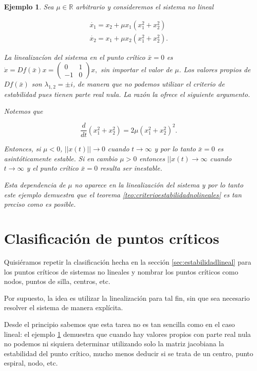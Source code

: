\documentclass[11pt]{book}
\theoremstyle{definition}
\numberwithin{definition}{section}
\theoremstyle{theorem}
\numberwithin{theorem}{section}
\numberwithin{lemma}{section}
\numberwithin{corollary}{section}
\theoremstyle{plain}
\newtheorem{example}{Ejemplo}
\numberwithin{example}{section}
\newcommand{\R}{{\ensuremath{\mathbb{R}}}}
\begin{document}
\begin{example} \label{ex:nolinealnohiperbolico}
Sea $\mu \in \R$ arbitrario y consideremos el sistema no lineal

$$
	\begin{array}{l}
		\dot{x_1} = x_2 + \mu x_1(x_1^2 + x_2^2) \\
		\dot{x_2} = x_1 + \mu x_2(x_1^2 + x_2^2).
	\end{array}
$$

La linealizacíon del sistema en el punto crítico $\bar{x} = 0$ es $\dot{x} = Df(\bar{x})x = \left( \begin{array}{ll} 0 & 1 \\ -1 & 0 \end{array} \right) x,$ sin importar el valor de $\mu$.
Los valores propios de $Df(\bar{x})$ son $\lambda_{1,2} = \pm i$, de manera que no podemos utilizar el criterio de estabilidad pues tienen parte real nula. La razón la ofrece el siguiente argumento.

Notemos que

$$ \dfrac{d}{dt} (x_1^2 + x_2^2) = 2\mu(x_1^2 + x_2^2)^2. $$

Entonces, si $\mu < 0$, $||x(t)|| \to 0$ cuando $t \to \infty$ y por lo tanto $\bar{x} = 0$ es asintóticamente estable.
Si en cambio $\mu > 0$ entonces $||x(t) \to \infty$ cuando $t \to \infty$ y el punto crítico $\bar{x} = 0$ resulta ser inestable.

Esta dependencia de $\mu$ no aparece en la linealización del sistema y por lo tanto este ejemplo demuestra que el teorema \ref{teo:criterioestabilidadnolineales} es tan preciso como es posible.
\end{example}


\section{Clasificación de puntos críticos}

Quisiéramos repetir la clasificación hecha en la sección \ref{sec:estabilidadlineal} para los puntos críticos de sistemas no lineales y nombrar los puntos críticos como nodos, puntos de silla, centros, etc.

Por supuesto, la idea es utilizar la linealización para tal fin, sin que sea necesario resolver el sistema de manera explícita.

Desde el principio sabemos que esta tarea no es tan sencilla como en el caso lineal: el ejemplo \ref{ex:nolinealnohiperbolico} demuestra que cuando hay valores propios con parte real nula no podemos ni siquiera determinar utilizando solo la matriz jacobiana la estabilidad del punto crítico, mucho menos deducir si se trata de un centro, punto espiral, nodo, etc.
\end{document}
